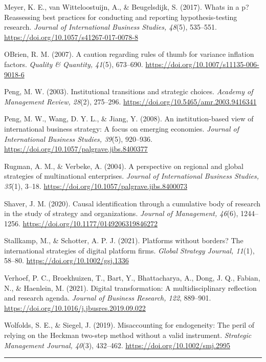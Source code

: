 \documentclass[12pt,a4paper]{article}
\begin{document}
Meyer, K. E., van Witteloostuijn, A., \& Beugelsdijk, S. (2017).
What\textquotesingle s in a p? Reassessing best practices for conducting
and reporting hypothesis-testing research. \emph{Journal of
International Business Studies, 48}(5), 535--551.
\url{https://doi.org/10.1057/s41267-017-0078-8}

O\textquotesingle Brien, R. M. (2007). A caution regarding rules of
thumb for variance inflation factors. \emph{Quality \& Quantity, 41}(5),
673--690. \url{https://doi.org/10.1007/s11135-006-9018-6}

Peng, M. W. (2003). Institutional transitions and strategic choices.
\emph{Academy of Management Review, 28}(2), 275--296.
\url{https://doi.org/10.5465/amr.2003.9416341}

Peng, M. W., Wang, D. Y. L., \& Jiang, Y. (2008). An institution-based
view of international business strategy: A focus on emerging economies.
\emph{Journal of International Business Studies, 39}(5), 920--936.
\url{https://doi.org/10.1057/palgrave.jibs.8400377}

Rugman, A. M., \& Verbeke, A. (2004). A perspective on regional and
global strategies of multinational enterprises. \emph{Journal of
International Business Studies, 35}(1), 3--18.
\url{https://doi.org/10.1057/palgrave.jibs.8400073}

Shaver, J. M. (2020). Causal identification through a cumulative body of
research in the study of strategy and organizations. \emph{Journal of
Management, 46}(6), 1244--1256.
\url{https://doi.org/10.1177/0149206319846272}

Stallkamp, M., \& Schotter, A. P. J. (2021). Platforms without borders?
The international strategies of digital platform firms. \emph{Global
Strategy Journal, 11}(1), 58--80. \url{https://doi.org/10.1002/gsj.1336}

Verhoef, P. C., Broekhuizen, T., Bart, Y., Bhattacharya, A., Dong, J.
Q., Fabian, N., \& Haenlein, M. (2021). Digital transformation: A
multidisciplinary reflection and research agenda. \emph{Journal of
Business Research, 122}, 889--901.
\url{https://doi.org/10.1016/j.jbusres.2019.09.022}

Wolfolds, S. E., \& Siegel, J. (2019). Misaccounting for endogeneity:
The peril of relying on the Heckman two-step method without a valid
instrument. \emph{Strategic Management Journal, 40}(3), 432--462.
\url{https://doi.org/10.1002/smj.2995}

\begin{center}\rule{0.5\linewidth}{0.5pt}\end{center}
\end{document}

